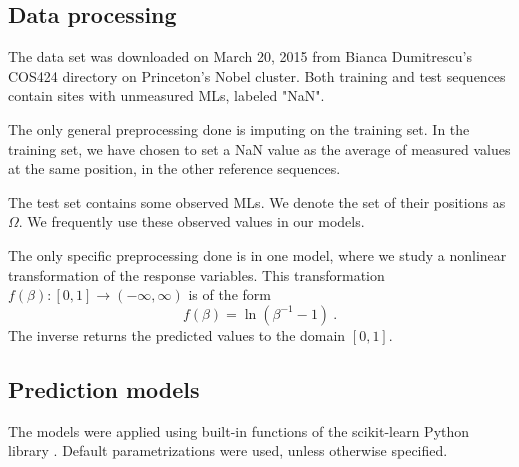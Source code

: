 \documentclass{article} %
\begin{document}
\subsection{Data processing}

The data set was downloaded on March 20, 2015 from Bianca Dumitrescu's COS424 directory on Princeton's Nobel cluster. Both training and test sequences contain sites with unmeasured MLs, labeled "NaN".

The only general preprocessing done is imputing on the training set. In the training set, we have chosen to set a NaN value as the average of measured values at the same position, in the other reference sequences. 

The test set contains some observed MLs. We denote the set of their positions as $\Omega$. We frequently use these observed values in our models.

The only specific preprocessing done is in one model, where we study a nonlinear transformation of the response variables. This transformation $f(\beta): [0,1] \to (-\infty,\infty)$ is of the form
\[ f(\beta) = \ln(\beta^{-1} - 1) \ .\]
The inverse returns the predicted values to the domain $[0,1]$.

\subsection{Prediction models}

The models were applied using built-in functions of the scikit-learn Python library \cite{scikit-learn}. Default parametrizations were used, unless otherwise specified.
\end{document}
